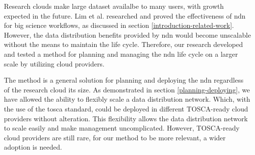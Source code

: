 








Research clouds make large dataset availalbe to many users, with growth expected in the future. Lim et al. researched and proved the effectiveness of \gls{ndn} for big science workflows, as discussed in section \ref{introduction-related-work}. However, the data distribution benefits provided by \gls{ndn} would become unscalable without the means to maintain the life cycle. Therefore, our research developed and tested a method for planning and managing the \gls{ndn} life cycle on a larger scale by utilizing cloud providers.

The method is a general solution for planning and deploying the \gls{ndn} regardless of the research cloud its size. As demonstrated in section \ref{planning-deploying}, we have allowed the ability to flexibly scale a data distribution network. Which, with the use of the \gls{tosca} standard, could be deployed in different TOSCA-ready cloud providers without alteration. This flexibility allows the data distribution network to scale easily and make management uncomplicated. However, TOSCA-ready cloud providers are still rare, for our method to be more relevant, a wider adoption is needed.


